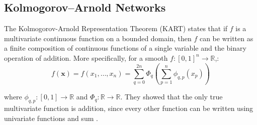 \documentclass{article}
\begin{document}
\begin{comment}

A Multi-Layer Perceptron (MLP) is a fully connected feedforward neural network consisting of multiple layers of nodes (neurons). Each node in a layer is connected to every node in the subsequent layer, and the node applies a nonlinear activation function to the weighted sum of its inputs.

Universal Approximation Theorem \parencite{HORNIK1989359} provides foundations to the popularity of MLPs. The theorem states that a feedforward network with a single hidden layer containing a finite number of neurons can approximate any continuous function on compact subsets of \(\mathbb{R}^n\), given appropriate activation functions. Mathematically, an MLP with \(L\) layers can be expressed as:
\begin{equation}
MLP(x) = \sigma_L(W_L \sigma_{L-1}(W_{L-1} \cdots \sigma_1(W_1 x + b_1) \cdots + b_{L-1}) + b_L),
\end{equation}
where:
\begin{itemize}
  \item \(x\) is the input vector.
  \item \(W_l\) and \(b_l\) are the weight matrix and bias vector for the \(l\)-th layer.
  \item \(\sigma_l\) is the activation function for the \(l\)-th layer.
\end{itemize}
\end{comment}

\subsection{Kolmogorov–Arnold Networks}

The Kolmogorov-Arnold Representation Theorem (KART) \parencite{kolmogorov1961representation} states that if \( f \) is a multivariate continuous function on a bounded domain, then \( f \) can be written as a finite composition of continuous functions of a single variable and the binary operation of addition. More specifically, for a smooth \( f : [0,1]^n \rightarrow \mathbb{R} \),:
\begin{equation}
f(\mathbf{x}) = f(x_1, \dots, x_n) = \sum_{q=0}^{2n} \Phi_q \left( \sum_{p=1}^{n} \phi_{q,p}(x_p) \right)
\end{equation}



where \(\phi_{q,p} : [0, 1] \to \mathbb{R}\) and \(\Phi_q : \mathbb{R} \to \mathbb{R}\). They showed that the only true multivariate function is addition, since every other function can be written using univariate functions and sum \parencite{liu2024kankolmogorovarnoldnetworks}.
\end{document}

